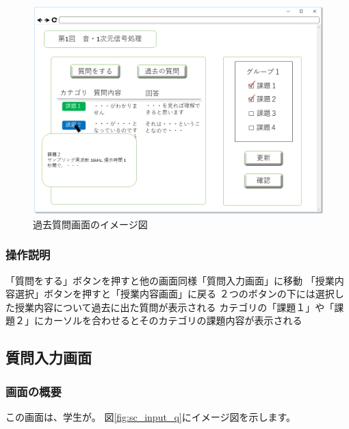 \begin{figure}[htbp]
\begin{center}
  \includegraphics[width=1\linewidth,clip]{./img/sc_pre_q.png}
  \caption{過去質問画面のイメージ図}\label{fig:sc_pre_q}
\end{center}
\end{figure}

\subsubsection{操作説明}
「質問をする」ボタンを押すと他の画面同様「質問入力画面」に移動
「授業内容選択」ボタンを押すと「授業内容画面」に戻る
２つのボタンの下には選択した授業内容について過去に出た質問が表示される
カテゴリの「課題１」や「課題２」にカーソルを合わせるとそのカテゴリの課題内容が表示される

\subsection{質問入力画面}
\subsubsection{画面の概要}
この画面は、学生が。
図\ref{fig:sc_input_q}にイメージ図を示します。

